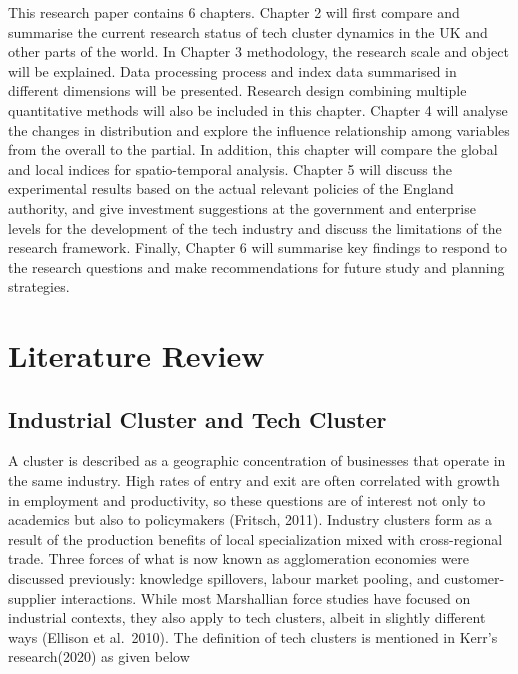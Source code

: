 \documentclass[
  12pt,
  oneside]{book}
\begin{document}
This research paper contains 6 chapters. Chapter 2 will first compare and summarise the current research status of tech cluster dynamics in the UK and other parts of the world. In Chapter 3 methodology, the research scale and object will be explained. Data processing process and index data summarised in different dimensions will be presented. Research design combining multiple quantitative methods will also be included in this chapter. Chapter 4 will analyse the changes in distribution and explore the influence relationship among variables from the overall to the partial. In addition, this chapter will compare the global and local indices for spatio-temporal analysis. Chapter 5 will discuss the experimental results based on the actual relevant policies of the England authority, and give investment suggestions at the government and enterprise levels for the development of the tech industry and discuss the limitations of the research framework. Finally, Chapter 6 will summarise key findings to respond to the research questions and make recommendations for future study and planning strategies.

\hypertarget{lit-review}{%
\chapter{Literature Review}\label{lit-review}}

\hypertarget{industrial-cluster-and-tech-cluster}{%
\section{Industrial Cluster and Tech Cluster}\label{industrial-cluster-and-tech-cluster}}

A cluster is described as a geographic concentration of businesses that operate in the same industry. High rates of entry and exit are often correlated with growth in employment and productivity, so these questions are of interest not only to academics but also to policymakers (Fritsch, 2011). Industry clusters form as a result of the production benefits of local specialization mixed with cross-regional trade. Three forces of what is now known as agglomeration economies were discussed previously: knowledge spillovers, labour market pooling, and customer-supplier interactions. While most Marshallian force studies have focused on industrial contexts, they also apply to tech clusters, albeit in slightly different ways (Ellison et al.~2010). The definition of tech clusters is mentioned in Kerr's research(2020) as given below
\end{document}
